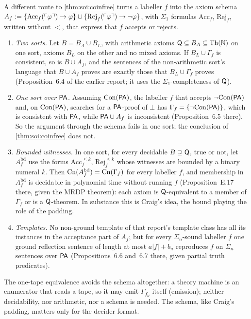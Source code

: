 \begin{remark}\label{rem:soi:schema}
A different route to \cref{thm:soi:coinfree} turns a labeller $f$ into the axiom schema $A_f:=\{\mathrm{Acc}_f(\ulcorner \varphi\urcorner)\to\varphi\}\cup\{\mathrm{Rej}_f(\ulcorner \varphi\urcorner)\to\neg\varphi\}$, with $\Sigma_1$ formulas $\mathrm{Acc}_f$, $\mathrm{Rej}_f$, written without $<$, that express that $f$ accepts or rejects.
\begin{enumerate}[label=(\alph*),leftmargin=*]
\item \emph{Two sorts.} Let $B=B_A\cup B_L$, with arithmetic axioms $\mathsf{Q}\subseteq B_A\subseteq\mathrm{Th}(\mathbb N)$ on one sort, axioms $B_L$ on the other and no mixed axioms. If $B_L\cup\Gamma_f$ is consistent, so is $B\cup A_f$, and the sentences of the non-arithmetic sort's language that $B\cup A_f$ proves are exactly those that $B_L\cup\Gamma_f$ proves (Proposition~6.4 of the earlier report; it uses the $\Sigma_1$-completeness of $\mathsf{Q}$).
\item \emph{One sort over $\mathsf{PA}$.} Assuming $\mathrm{Con}(\mathsf{PA})$, the labeller $f$ that accepts $\neg\mathrm{Con}(\mathsf{PA})$ and, on $\mathrm{Con}(\mathsf{PA})$, searches for a $\mathsf{PA}$-proof of $\bot$ has $\Gamma_f=\{\neg\mathrm{Con}(\mathsf{PA})\}$, which is consistent with $\mathsf{PA}$, while $\mathsf{PA}\cup A_f$ is inconsistent (Proposition~6.5 there). So the argument through the schema fails in one sort; the conclusion of \cref{thm:soi:coinfree} does not.
\item \emph{Bounded witnesses.} In one sort, for every decidable $B\supseteq\mathsf{Q}$, true or not, let $A^{\mathrm{bd}}_f$ use the forms $\mathrm{Acc}^{\le k}_f$, $\mathrm{Rej}^{\le k}_f$ whose witnesses are bounded by a binary numeral $k$. Then $\mathrm{Cn}(A^{\mathrm{bd}}_f)=\mathrm{Cn}(\Gamma_f)$ for every labeller $f$, and membership in $A^{\mathrm{bd}}_f$ is decidable in polynomial time without running $f$ (Proposition~E.17 there, given the MRDP theorem): each axiom is $\mathsf{Q}$-equivalent to a member of $\Gamma_f$ or is a $\mathsf{Q}$-theorem. In substance this is Craig's idea, the bound playing the role of the padding.
\item \emph{Templates.} No non-ground template of that report's template class has all its instances in the acceptance part of $A_f$; but for every $\Sigma_n$-sound labeller $f$ one ground reflection sentence of length at most $a\lvert f\rvert+b_n$ reproduces $f$ on $\Sigma_n$ sentences over $\mathsf{PA}$ (Propositions~6.6 and~6.7 there, given partial truth predicates).
\end{enumerate}
The one-tape equivalence avoids the schema altogether: a theory machine is an enumerator that reads a tape, so it may emit $\Gamma_{f_\omega}$ itself (emission); neither decidability, nor arithmetic, nor a schema is needed. The schema, like Craig's padding, matters only for the decider format.
\end{remark}

